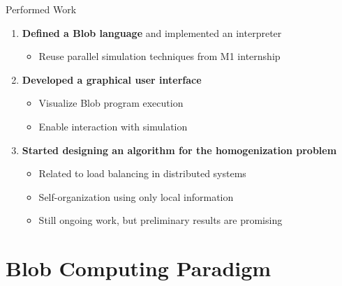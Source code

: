\documentclass{beamer}
\begin{document}
\begin{frame}{Performed Work}
    \begin{enumerate}
        \item \textbf{Defined a Blob language} and implemented an interpreter
            \begin{itemize}
                \item Reuse parallel simulation techniques from M1 internship
            \end{itemize}
    
    \vfill

        \item \textbf{Developed a graphical user interface}
            \begin{itemize}
                \item Visualize Blob program execution
                \item Enable interaction with simulation
            \end{itemize}
        
    \vfill

        \item \textbf{Started designing an algorithm for the homogenization problem}
            \begin{itemize}
                \item Related to load balancing in distributed systems
                \item Self-organization using only local information
                \item Still ongoing work, but preliminary results are promising
            \end{itemize}
    \end{enumerate}
\end{frame}

\section{Blob Computing Paradigm}
\end{document}
